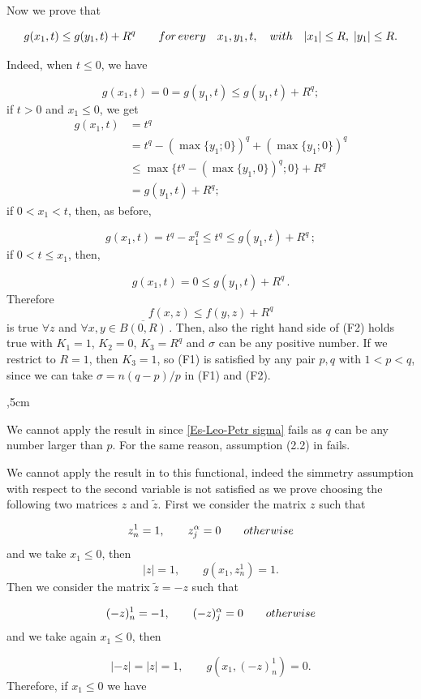 \documentclass[a4paper,10pt]{article}
\theoremstyle{plain}
\theoremstyle{definition}
\numberwithin{equation}{section} \makeatletter
\begin{document}
\noindent Now we prove that  

$$g(x_1,t)\le g(y_1,t)+R^q \qquad {\rm for \, every} \quad   x_1,y_1,t, \quad {\rm with }\quad |x_1|\le R,\; |y_1|\le R.$$

\noindent
Indeed, when $t\le 0$, we have

$$g(x_1, t)=0= g(y_1, t)\le g(y_1, t)+R^q; $$
if $t>0$ and $x_1\le 0$, we get
\begin{align*}
  g(x_1, t) &=t^q \\ &= t^q- 
(\max\{y_1;0\})^q+(\max\{y_1;0\})^q \\ & \le   \max\{t^q-(\max\{y_1,0\})^q;0\}+R^q \\ & = 
g(y_1, t)+R^q;
\end{align*}
if $0< x_1<t$, then, as before,

$$g(x_1, t)=t^q-x_1^q\le t^q\le g(y_1, t)+R^q\,; $$
if $0< t \leq x_1$, then, 

$$g(x_1, t)= 0 \le g(y_1, t)+R^q\,.$$
Therefore 
$$f(x,z)\le f(y,z)+R^q$$
is true $\forall z$ and $\forall x,y\in \overline{B(0,R)} \,.$
Then, also the right hand side of (F2) holds true with $K_1 = 1$, $K_2 = 0$, $K_3 = R^q$ and $\sigma$ can be any positive number.
If we restrict to $R=1$, then $K_3 =1$, so (F1) is satisfied by any pair $p,q$ with $1<p<q$, since we can take $\sigma = n(q-p)/p$ in (F1) and (F2).


,5cm

\noindent
We cannot apply the result in \cite{Esposito-Leonetti-Petricca} since \eqref{Es-Leo-Petr sigma} fails as $q$ can be any number larger than $p$. For the same reason, assumption (2.2) in \cite{Koch-Ruf-Schaffner} fails.

\noindent We cannot apply the result in \cite{BC} to this functional, indeed the simmetry assumption with respect to the second variable is not satisfied as we prove choosing the following two matrices $z$ and $\tilde{z}$. First we consider the matrix $z$ such that

\[
z_n^1=1,  \qquad z_j^{\alpha}=0 \qquad {\rm otherwise}
\]
 and we take $x_1\le0$, then 
\[
|z|=1, \qquad g(x_1,z_n^1)= 1.
\]
Then we consider the matrix $\tilde{z}=-z$ such that

\[
(-z)_n^1=-1,  \qquad (-z)_j^{\alpha}=0 \qquad {\rm otherwise}
\]
and we take again $x_1\le0$, then 

\[
|-z|=|z|=1, \qquad g(x_1,(-z)_n^1)= 0.
\]
Therefore, if  $x_1\le0$ we have
\end{document}
